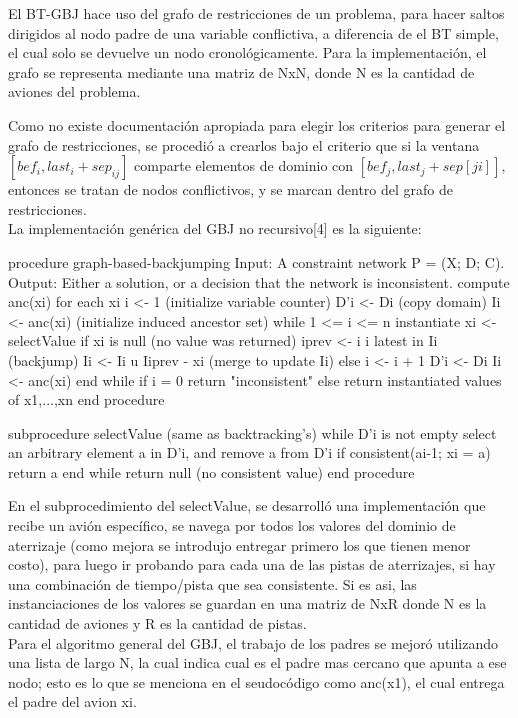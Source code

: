 \documentclass[letter, 11pt]{article}
\begin{document}
El BT-GBJ hace uso del grafo de restricciones de un problema, para hacer saltos dirigidos al nodo padre de una variable conflictiva, a diferencia de el BT simple, el cual solo se devuelve un nodo cronológicamente. 
Para la implementación, el grafo se representa mediante una matriz de NxN, donde N es la cantidad de aviones del problema.

Como no existe documentación apropiada para elegir los criterios para generar el grafo de restricciones, se procedió a crearlos bajo el criterio que si la ventana $[bef_i,last_i + sep_{ij}]$ comparte elementos de dominio con $[bef_j,last_j + sep[ji]]$, entonces se tratan de nodos conflictivos, y se marcan dentro del grafo de restricciones.
\\

La implementación genérica del GBJ no recursivo[4] es la siguiente:

\begin{verbatimtab}[4]
procedure graph-based-backjumping
Input: A constraint network P = (X; D; C). Output: Either a solution, or a decision that the network is inconsistent.
	compute anc(xi) for each xi
	i <- 1 (initialize variable counter)
	D'i <- Di (copy domain)
	Ii <- anc(xi) (initialize induced ancestor set)
	while 1 <= i <= n
		instantiate xi <- selectValue
		if xi is null (no value was returned)
			iprev <- i
			i latest in Ii (backjump)
			Ii <- Ii u Iiprev - {xi} (merge to update Ii)
		else
			i <- i + 1
			D'i <- Di
			Ii <- anc(xi)
	end while
	if i = 0
		return "inconsistent"
	else
		return instantiated values of {x1,...,xn}
end procedure

subprocedure selectValue (same as backtracking's)
	while D'i is not empty
		select an arbitrary element a in D'i, and remove a from D'i
		if consistent(a{i-1}; xi = a)
			return a
	end while
	return null (no consistent value)
end procedure
\end{verbatimtab}

En el subprocedimiento del selectValue, se desarrolló una implementación que recibe un avión específico, se navega por todos los valores del dominio de aterrizaje (como mejora se introdujo entregar primero los que tienen menor costo), para luego ir probando para cada una de las pistas de aterrizajes, si hay una combinación de tiempo/pista que sea consistente. Si es asi, las instanciaciones de los valores se guardan en una matriz de NxR donde N es la cantidad de aviones y R es la cantidad de pistas.
\\

Para el algoritmo general del GBJ, el trabajo de los padres se mejoró utilizando una lista de largo N, la cual indica cual es el padre mas cercano que apunta a ese nodo; esto es lo que se menciona en el seudocódigo como anc(x1), el cual entrega el padre del avion xi.
\\
\end{document}

